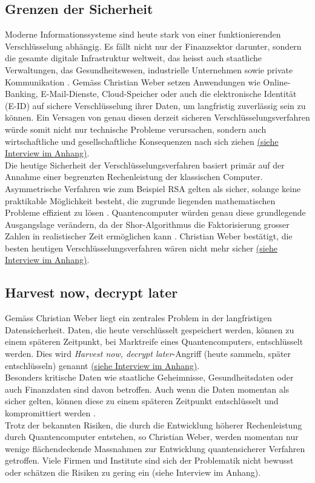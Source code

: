 \subsection{Grenzen der Sicherheit}
Moderne Informationssysteme sind heute stark von einer funktionierenden Verschlüsselung abhängig.
Es fällt nicht nur der Finanzsektor darunter, sondern die gesamte digitale Infrastruktur weltweit, das heisst auch staatliche
Verwaltungen, das Gesundheitswesen, industrielle Unternehmen sowie private Kommunikation \cite{menezes1996handbook}.
Gemäss Christian Weber setzen Anwendungen wie Online-Banking, E-Mail-Dienste, Cloud-Speicher oder auch die elektronische Identität (E-ID) auf sichere Verschlüsselung
ihrer Daten, um langfristig zuverlässig sein zu können.
Ein Versagen von genau diesen derzeit sicheren Verschlüsselungsverfahren würde somit nicht nur technische Probleme
verursachen, sondern auch wirtschaftliche und gesellschaftliche Konsequenzen nach sich ziehen \hyperlink{dependency_cryptography}{(siehe Interview im Anhang)}.
\\
Die heutige Sicherheit der Verschlüsselungsverfahren basiert primär auf der Annahme einer begrenzten Rechenleistung der klassischen Computer.
Asymmetrische Verfahren wie zum Beispiel RSA gelten als sicher, solange
keine praktikable Möglichkeit besteht, die zugrunde liegenden
mathematischen Probleme effizient zu lösen \cite{menezes1996handbook}.
Quantencomputer würden genau diese grundlegende Ausgangslage verändern,
da der Shor-Algorithmus die Faktorisierung grosser Zahlen in
realistischer Zeit ermöglichen kann \cite{mandrysch2016}.
Christian Weber bestätigt, die besten heutigen Verschlüsselungsverfahren wären nicht mehr sicher \hyperlink{dependency_cryptography}{(siehe Interview im Anhang)}.

\subsection{Harvest now, decrypt later}
Gemäss Christian Weber liegt ein zentrales Problem in der langfristigen Datensicherheit.
Daten, die heute verschlüsselt gespeichert werden, können zu einem späteren Zeitpunkt, bei Marktreife eines Quantencomputers, entschlüsselt werden.
Dies wird \emph{Harvest now, decrypt later}-Angriff (heute sammeln, später entschlüsseln) genannt \hyperlink{longterm_security}{(siehe Interview im Anhang)}.
\\
Besonders kritische Daten wie staatliche Geheimnisse, Gesundheitsdaten oder auch Finanzdaten sind davon betroffen.
Auch wenn die Daten momentan als sicher gelten, können diese zu einem
späteren Zeitpunkt entschlüsselt und kompromittiert werden \cite{mandrysch2016}.
\\
Trotz der bekannten Risiken, die durch die Entwicklung höherer
Rechenleistung durch Quantencomputer entstehen, so Christian Weber, werden momentan nur
wenige flächendeckende Massnahmen zur Entwicklung quantensicherer
Verfahren getroffen.
Viele Firmen und Institute sind sich der Problematik nicht bewusst oder
schätzen die Risiken zu gering ein (siehe Interview im Anhang).

